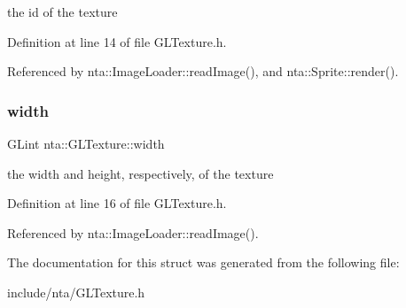 the id of the texture 



Definition at line 14 of file G\+L\+Texture.\+h.



Referenced by nta\+::\+Image\+Loader\+::read\+Image(), and nta\+::\+Sprite\+::render().

\mbox{\label{structnta_1_1GLTexture_a8f4d13ab2b19b700f76334c46458ac48}} 
\subsubsection{\texorpdfstring{width}{width}}
{\footnotesize\ttfamily G\+Lint nta\+::\+G\+L\+Texture\+::width}



the width and height, respectively, of the texture 



Definition at line 16 of file G\+L\+Texture.\+h.



Referenced by nta\+::\+Image\+Loader\+::read\+Image().



The documentation for this struct was generated from the following file\+:\begin{DoxyCompactItemize}
\item 
include/nta/G\+L\+Texture.\+h\end{DoxyCompactItemize}

